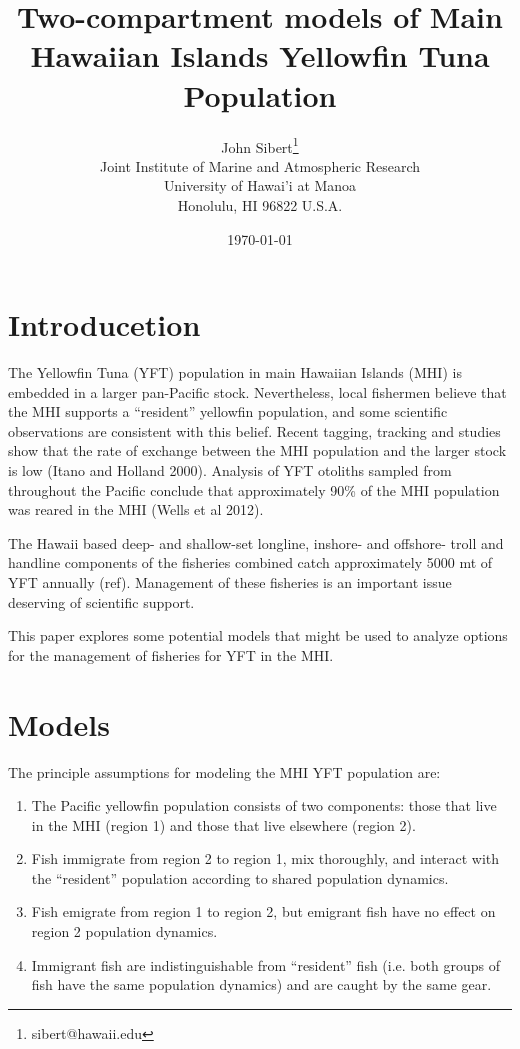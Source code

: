 \documentclass[12pt,letterpaper]{article}
\title{Two-compartment models of Main Hawaiian Islands Yellowfin Tuna
Population}
\author{
John Sibert\thanks{sibert@hawaii.edu}\\
Joint Institute of Marine and Atmospheric Research\\
University of Hawai'i at Manoa\\
Honolulu, HI  96822 U.S.A.\\[0.125in]
\date{\today}
}
\newcommand\doublespacing{\baselineskip=1.6\normalbaselineskip}
\begin{document}
\maketitle

\doublespacing

\section*{Introducetion}
The Yellowfin Tuna (YFT) population in main Hawaiian Islands (MHI) is
embedded in a larger pan-Pacific stock. Nevertheless, local fishermen
believe that the MHI supports a ``resident'' yellowfin population, and
some scientific observations are consistent with this belief. 
Recent tagging, tracking and
studies show that the rate of exchange between the MHI population
and the larger stock is low (Itano and Holland 2000). Analysis
of YFT otoliths sampled from
throughout the Pacific conclude that approximately 90\% of the MHI
population was reared in the MHI (Wells et al 2012).

The Hawaii based deep- and shallow-set longline, inshore- and
offshore- troll and handline components of the fisheries combined catch
approximately 5000 mt of YFT annually (ref). Management of these
fisheries is an important issue deserving of scientific support.

This paper explores some potential models that might be used to
analyze options for the management of fisheries for YFT in the MHI.

\section*{Models}
The principle assumptions for modeling the MHI YFT population are:
\begin{enumerate}
\item The Pacific yellowfin population consists of two components: those
that live in the MHI (region 1) and those that live elsewhere (region
2).
\item Fish immigrate from region 2 to region 1, mix thoroughly, and
interact with the ``resident'' population according to
shared population dynamics.
\item Fish emigrate from region 1 to region 2, but emigrant fish have
no effect on region 2 population dynamics.
\item Immigrant fish are indistinguishable from ``resident'' fish
(i.e. both groups of fish have the same population dynamics) and are
caught by the same gear.
\end{enumerate}
\end{document}
